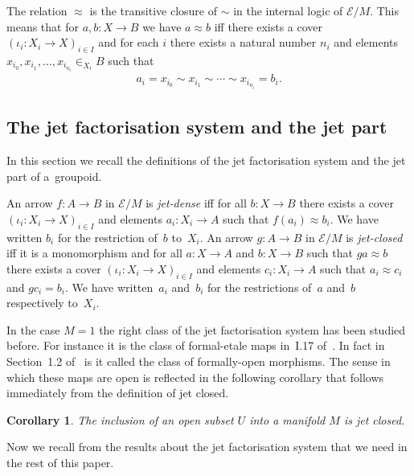 \documentclass[pdftex]{sigma}
\numberwithin{equation}{section}
\newtheorem{Corollary}[Theorem]{Corollary}
\begin{document}
The relation $\approx$ is the transitive closure of $\sim$ in the internal logic of $\mathcal{E}/M$. This means that for $a,b\colon X \rightarrow B$ we have $a\approx b$ if\/f there exists a cover $(\iota_{i}\colon X_{i}\rightarrow X)_{i\in I}$ and for each $i$ there exists a natural number $n_{i}$ and elements $x_{i_{0}},x_{i_{1}},\dots ,x_{i_{n_{i}}}\in_{X_{i}}B$ such that
\begin{gather*}a_{i}=x_{i_{0}}\sim x_{i_{1}}\sim\cdots \sim x_{i_{n_{i}}}=b_{i}.\end{gather*}

\subsection{The jet factorisation system and the jet part}

In this section we recall the def\/initions of the jet factorisation system and the jet part of a~groupoid.

An arrow $f\colon A \rightarrow B$ in $\mathcal{E}/M$ is \emph{jet-dense} if\/f for all $b\colon X \rightarrow B$ there exists a cover $(\iota_{i}\colon X_{i}\rightarrow X)_{i\in I}$ and elements $a_{i}\colon X_i \rightarrow A$ such that $f(a_{i})\approx b_{i}$. We have written $b_i$ for the restriction of~$b$ to~$X_i$. An arrow $g\colon A \rightarrow B$ in $\mathcal{E}/M$ is \emph{jet-closed} if\/f it is a monomorphism and for all $a\colon X \rightarrow A$ and $b\colon X \rightarrow B$ such that $ga\approx b$ there exists a cover $(\iota_{i}\colon X_{i}\rightarrow X)_{i\in I}$ and elements $c_{i}\colon X_i \rightarrow A$ such that $a_{i}\approx c_{i}$ and $gc_{i}=b_{i}$. We have written~$a_i$ and~$b_i$ for the restrictions of~$a$ and~$b$ respectively to~$X_i$.

In the case $M=1$ the right class of the jet factorisation system has been studied before. For instance it is the class of formal-etale maps in~I.17 of~\cite{MR2244115}. In fact in Section~1.2 of~\cite{Johnstone2014} is it called the class of formally-open morphisms.
The sense in which these maps are open is ref\/lected in the following corollary that follows immediately from the def\/inition of jet closed.

\begin{Corollary}\label{cor:open-inclusion-is-jet-closed} The inclusion of an open subset $U$ into a manifold $M$ is jet closed.
\end{Corollary}

Now we recall from \cite{burke-relative-to-local-models} the results about the jet factorisation system that we need in the rest of this paper.
\end{document}
